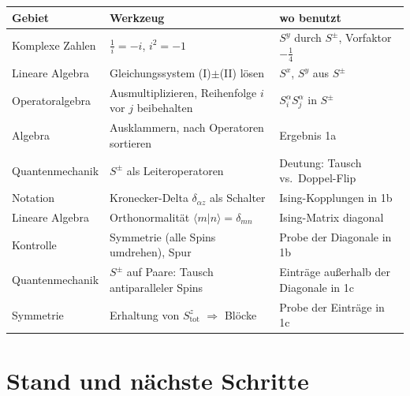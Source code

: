 \documentclass[11pt,a4paper]{article}
\begin{document}
\begin{center}
\begin{tabular}{@{}>{\raggedright\arraybackslash}p{3.2cm}>{\raggedright\arraybackslash}p{5.6cm}>{\raggedright\arraybackslash}p{5.2cm}@{}}
\toprule
Gebiet & Werkzeug & wo benutzt \\
\midrule
Komplexe Zahlen & $\tfrac1i = -i$, $i^2=-1$ & $S^y$ durch $S^\pm$, Vorfaktor $-\tfrac14$ \\
Lineare Algebra & Gleichungssystem (I)$\pm$(II) lösen & $S^x$, $S^y$ aus $S^\pm$ \\
Operatoralgebra & Ausmultiplizieren, Reihenfolge $i$ vor $j$ beibehalten & $S^\alpha_iS^\alpha_j$ in $S^\pm$ \\
Algebra & Ausklammern, nach Operatoren sortieren & Ergebnis 1a \\
Quantenmechanik & $S^\pm$ als Leiteroperatoren & Deutung: Tausch vs.\ Doppel-Flip \\
Notation & Kronecker-Delta $\delta_{\alpha z}$ als Schalter & Ising-Kopplungen in 1b \\
Lineare Algebra & Orthonormalität $\langle m|n\rangle=\delta_{mn}$ & Ising-Matrix diagonal \\
Kontrolle & Symmetrie (alle Spins umdrehen), Spur & Probe der Diagonale in 1b \\
Quantenmechanik & $S^\pm$ auf Paare: Tausch antiparalleler Spins & Einträge außerhalb der Diagonale in 1c \\
Symmetrie & Erhaltung von $S^z_\text{tot}$ $\Rightarrow$ Blöcke & Probe der Einträge in 1c \\
\bottomrule
\end{tabular}
\end{center}

\section{Stand und nächste Schritte}
\end{document}
